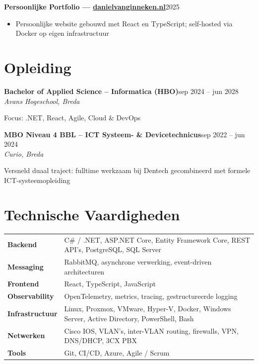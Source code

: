 \documentclass[a4paper,10pt]{article}
\newcommand{\cventry}[4]{%
  {\textbf{#1}}\hfill{\small\color{lightgray}#2}\\
  {\textit{#3}}\hfill{\small\color{lightgray}#4}\vspace{2pt}%
}
\newcommand{\cvsimple}[2]{%
  {\textbf{#1}}\hfill{\small\color{lightgray}#2}\vspace{1pt}%
}
\begin{document}
\vspace{4pt}

\cvsimple{Persoonlijke Portfolio --- \href{https://danielvanginneken.nl}{danielvanginneken.nl}}{2025}
\begin{itemize}
  \item Persoonlijke website gebouwd met React en TypeScript; self-hosted via Docker op eigen infrastructuur
\end{itemize}

\section{Opleiding}

\cventry{Bachelor of Applied Science -- Informatica (HBO)}{sep 2024 -- jun 2028}%
        {Avans Hogeschool, Breda}{}
\vspace{-1pt}
{\small Focus: .NET, React, Agile, Cloud \& DevOps}

\vspace{4pt}

\cventry{MBO Niveau 4 BBL -- ICT Systeem- \& Devicetechnicus}{sep 2022 -- jun 2024}%
        {Curio, Breda}{}
\vspace{-1pt}
{\small Versneld duaal traject: fulltime werkzaam bij Dentech gecombineerd met formele ICT-systeemopleiding}

\section{Technische Vaardigheden}

\begin{tabularx}{\textwidth}{@{}>{\bfseries\small}l@{\hspace{8pt}}X@{}}
Backend         & C\# / .NET, ASP.NET Core, Entity Framework Core, REST API's, PostgreSQL, SQL Server \\[3pt]
Messaging       & RabbitMQ, asynchrone verwerking, event-driven architecturen \\[3pt]
Frontend        & React, TypeScript, JavaScript \\[3pt]
Observability   & OpenTelemetry, metrics, tracing, gestructureerde logging \\[3pt]
Infrastructuur  & Linux, Proxmox, VMware, Hyper-V, Docker, Windows Server, Active Directory, PowerShell, Bash \\[3pt]
Netwerken       & Cisco IOS, VLAN's, inter-VLAN routing, firewalls, VPN, DNS/DHCP, 3CX PBX \\[3pt]
Tools           & Git, CI/CD, Azure, Agile / Scrum \\
\end{tabularx}
\end{document}
